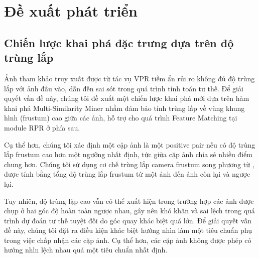 \section{Đề xuất phát triển}

\subsection{Chiến lược khai phá đặc trưng dựa trên độ trùng lắp}
Ảnh tham khảo truy xuất được từ tác vụ VPR tiềm ẩn rủi ro không đủ độ trùng lắp với ảnh đầu vào, dẫn đến sai sót trong quá trình tính toán tư thế. Để giải quyết vấn đề này, chúng tôi đề xuất một chiến lược khai phá mới dựa trên hàm khai phá Multi-Similarity Miner \cite{wang2019multi} nhằm đảm bảo tính trùng lấp về vùng khung hình (frustum) cao giữa các ảnh, hỗ trợ cho quá trình Feature Matching tại module RPR ở phía sau.

Cụ thể hơn, chúng tôi xác định một cặp ảnh là một positive pair nếu có độ trùng lắp frustum cao hơn một ngưỡng nhất định, tức giữa cặp ảnh chia sẻ nhiều điểm chung hơn. Chúng tôi sử dụng cơ chế trùng lắp camera frustum song phương từ \cite{9008579}, được tính bằng tổng độ trùng lắp frustum từ một ảnh đến ảnh còn lại và ngược lại.

Tuy nhiên, độ trùng lặp cao vẫn có thể xuất hiện trong trường hợp các ảnh được chụp ở hai góc độ hoàn toàn ngược nhau, gây nên khó khăn và sai lệch trong quá trình dự đoán tư thế tuyệt đối do góc quay khác biệt quá lớn. Để giải quyết vấn đề này, chúng tôi đặt ra điều kiện khác biệt hướng nhìn làm một tiêu chuẩn phụ trong việc chấp nhận các cặp ảnh. Cụ thể hơn, các cặp ảnh không được phép có hướng nhìn lệch nhau quá một tiêu chuẩn nhất định.



